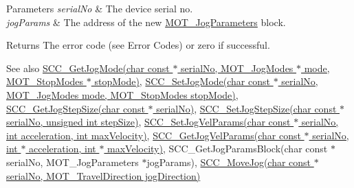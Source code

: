 \begin{DoxyParams}{Parameters}
{\em serial\+No} & The device serial no. \\
\hline
{\em jog\+Params} & The address of the new \hyperlink{struct_m_o_t___jog_parameters}{M\+O\+T\+\_\+\+Jog\+Parameters} block. \\
\hline
\end{DoxyParams}
\begin{DoxyReturn}{Returns}
The error code (see Error Codes) or zero if successful. 
\end{DoxyReturn}
\begin{DoxySeeAlso}{See also}
\hyperlink{group___k_cube_stepper_ga175e078da8fb47396ce927ed6bf8fbd9}{S\+C\+C\+\_\+\+Get\+Jog\+Mode(char const $\ast$ serial\+No, M\+O\+T\+\_\+\+Jog\+Modes $\ast$ mode, M\+O\+T\+\_\+\+Stop\+Modes $\ast$ stop\+Mode)}, \hyperlink{group___k_cube_stepper_ga6504337d0dfd4ae9076f493b0f209ee5}{S\+C\+C\+\_\+\+Set\+Jog\+Mode(char const $\ast$ serial\+No, M\+O\+T\+\_\+\+Jog\+Modes mode, M\+O\+T\+\_\+\+Stop\+Modes stop\+Mode)}, \hyperlink{group___k_cube_stepper_gaa628ab92b321b2fc84b83e234c10eda9}{S\+C\+C\+\_\+\+Get\+Jog\+Step\+Size(char const $\ast$ serial\+No)}, \hyperlink{group___k_cube_stepper_gafb9a2b1e88b11dc485de37787ed9866c}{S\+C\+C\+\_\+\+Set\+Jog\+Step\+Size(char const $\ast$ serial\+No, unsigned int step\+Size)}, \hyperlink{group___k_cube_stepper_ga060d0d1d5f56464d3ee486117034aaf4}{S\+C\+C\+\_\+\+Set\+Jog\+Vel\+Params(char const $\ast$ serial\+No, int acceleration, int max\+Velocity)}, \hyperlink{group___k_cube_stepper_gad17e113a6d0742937c7ef2955cf1aecc}{S\+C\+C\+\_\+\+Get\+Jog\+Vel\+Params(char const $\ast$ serial\+No, int $\ast$ acceleration, int $\ast$ max\+Velocity)}, S\+C\+C\+\_\+\+Get\+Jog\+Params\+Block(char const $\ast$ serial\+No, M\+O\+T\+\_\+\+Jog\+Parameters $\ast$jog\+Params), \hyperlink{group___k_cube_stepper_ga183454cf1f83e6feff1a74ef1870a7a7}{S\+C\+C\+\_\+\+Move\+Jog(char const $\ast$ serial\+No, M\+O\+T\+\_\+\+Travel\+Direction jog\+Direction)}


\end{DoxySeeAlso}

\begin{DoxyCodeInclude}
\end{DoxyCodeInclude}
